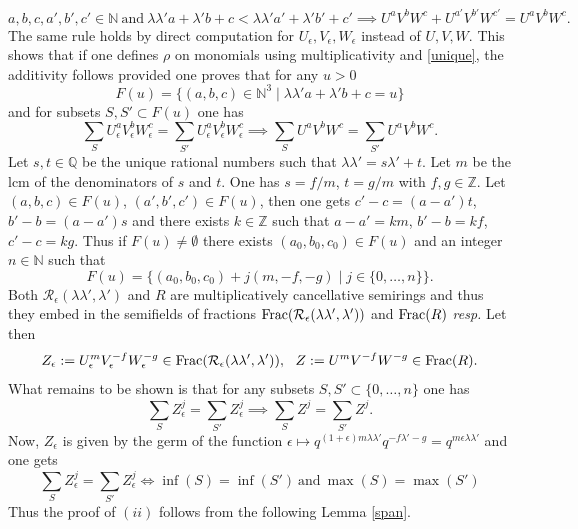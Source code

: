 \documentclass[noams,lp]{compositio}
\def\N{{\mathbb N}}
\def\Q{{\mathbb Q}}
\def\Z{{\mathbb Z}}
\def\cR{{\mathcal R}}
\def\mc{multiplicatively cancellative }
\begin{document}
$$
a,b,c,a',b',c'\in \N\ \text{and}\ \lambda\lambda' a+\lambda'b+c<\lambda\lambda' a'+\lambda'b'+c' \implies U^aV^bW^c+U^{a'}V^{b'}W^{c'}=U^aV^bW^c.
$$
The same rule holds by direct computation for $U_\epsilon,V_\epsilon,W_\epsilon$ instead of $U,V,W$. This shows that if one defines $\rho$ on monomials using multiplicativity and \eqref{unique}, the additivity follows provided one proves that for any $u>0$ 
$$
F(u)=\{(a,b,c)\in \N^3\mid \lambda\lambda' a+\lambda'b+c=u\}
$$
and for subsets $S,S'\subset F(u)$ one has
$$
\sum_S U_\epsilon^aV_\epsilon^bW_\epsilon^c=\sum_{S'} U_\epsilon^aV_\epsilon^bW_\epsilon^c \implies
\sum_S U^aV^bW^c=\sum_{S'} U^aV^bW^c.
$$
Let $s,t\in \Q$ be the unique rational numbers  such that $\lambda\lambda'=s\lambda'+t$. Let $m$ be the lcm of the denominators of $s$ and $t$. One has $s=f/m$, $t=g/m$ with $f,g\in\Z$. Let $(a,b,c)\in F(u)$, $(a',b',c')\in F(u)$, then  one gets $c'-c=(a-a')t$, $b'-b=(a-a')s$ and there exists $k\in \Z$ such that $a-a'=km$, $b'-b=kf$, $c'-c=kg$. Thus if $F(u)\neq \emptyset$ there exists $(a_0,b_0,c_0)\in F(u)$ and an integer $n\in \N$ such that 
$$
F(u)=\{(a_0,b_0,c_0)+j(m,-f,-g)\mid j\in \{0,\ldots,n\}\}.
$$
 Both $\cR_\epsilon(\lambda\lambda',\lambda')$ and $R$ are \mc semirings and thus they embed in the semifields of fractions ${\rm Frac}(\cR_\epsilon(\lambda\lambda',\lambda'))$ and ${\rm Frac}(R)$ {\em resp.} Let then
$$
Z_\epsilon:=U_\epsilon^mV_\epsilon^{-f}W_\epsilon^{-g}\in {\rm Frac}(\cR_\epsilon(\lambda\lambda',\lambda')),
\  \  Z:=U^mV^{-f}W^{-g}\in {\rm Frac}(R).
$$
What  remains to be shown is that for any subsets $S,S'\subset \{0,\ldots,n\}$ one has 
$$
\sum_S Z_\epsilon^j=\sum_{S'} Z_\epsilon^j \implies
\sum_S Z^j=\sum_{S'} Z^j.
$$
Now, $Z_\epsilon$ is given by the germ of the function $\epsilon\mapsto q^{(1+\epsilon)m\lambda\lambda'}q^{-f\lambda'-g}=q^{m\epsilon \lambda\lambda'}$ and one gets 
$$
\sum_S Z_\epsilon^j=\sum_{S'} Z_\epsilon^j\iff \inf(S)=\inf(S')\ \text{and} \ \max(S)=\max(S')
$$
Thus the proof of $(ii)$ follows from the following Lemma \ref{span}. \endproof
\end{document}
